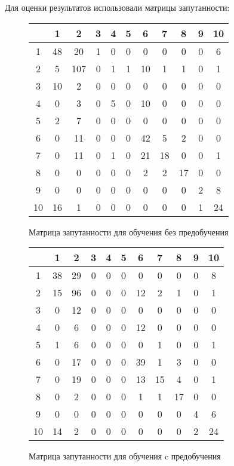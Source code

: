 {    Для оценки результатов использовали матрицы запутанности:

    \begin{figure}[H]
        \centering
        \begin{tabular}{|c|c|c|c|c|c|c|c|c|c|c|}
            \hline
              & 1 & 2 & 3 & 4 & 5 & 6 & 7 & 8 & 9 & 10 \\ \hline
            1 & 48 & 20 & 1 & 0 & 0 & 0 & 0 & 0 & 0 & 6 \\ \hline
            2 & 5 & 107 & 0 & 1 & 1 & 10 & 1 & 1 & 0 & 1 \\ \hline
            3 & 10 & 2 & 0 & 0 & 0 & 0 & 0 & 0 & 0 & 0 \\ \hline
            4 & 0 & 3 & 0 & 5 & 0 & 10 & 0 & 0 & 0 & 0 \\ \hline
            5 & 2 & 7 & 0 & 0 & 0 & 0 & 0 & 0 & 0 & 0 \\ \hline
            6 & 0 & 11 & 0 & 0 & 0 & 42 & 5 & 2 & 0 & 0 \\ \hline
            7 & 0 & 11 & 0 & 1 & 0 & 21 & 18 & 0 & 0 & 1 \\ \hline
            8 & 0 & 0 & 0 & 0 & 0 & 2 & 2 & 17 & 0 & 0 \\ \hline
            9 & 0 & 0 & 0 & 0 & 0 & 0 & 0 & 0 & 2 & 8 \\ \hline
            10 & 16 & 1 & 0 & 0 & 0 & 0 & 0 & 0 & 1 & 24 \\ \hline
        \end{tabular}
        \caption{Матрица запутанности для обучения без предобучения}
    \end{figure}

    \begin{figure}[H]

        \centering
        \begin{tabular}{|c|c|c|c|c|c|c|c|c|c|c|}
        \hline
            & 1 & 2 & 3 & 4 & 5 & 6 & 7 & 8 & 9 & 10 \\ \hline
            1 & 38 & 29 & 0 & 0 & 0 & 0 & 0 & 0 & 0 & 8 \\ \hline
            2 & 15 & 96 & 0 & 0 & 0 & 12 & 2 & 1 & 0 & 1 \\ \hline
            3 & 0 & 12 & 0 & 0 & 0 & 0 & 0 & 0 & 0 & 0 \\ \hline
            4 & 0 & 6 & 0 & 0 & 0 & 12 & 0 & 0 & 0 & 0 \\ \hline
            5 & 1 & 6 & 0 & 0 & 0 & 0 & 1 & 0 & 0 & 1 \\ \hline
            6 & 0 & 17 & 0 & 0 & 0 & 39 & 1 & 3 & 0 & 0 \\ \hline
            7 & 0 & 19 & 0 & 0 & 0 & 13 & 15 & 4 & 0 & 1 \\ \hline
            8 & 0 & 2 & 0 & 0 & 0 & 1 & 1 & 17 & 0 & 0 \\ \hline
            9 & 0 & 0 & 0 & 0 & 0 & 0 & 0 & 0 & 4 & 6 \\ \hline
            10 & 14 & 2 & 0 & 0 & 0 & 0 & 0 & 0 & 2 & 24 \\ \hline
        \end{tabular}
        \caption{Матрица запутанности для обучения c предобучения}
    \end{figure}

}
